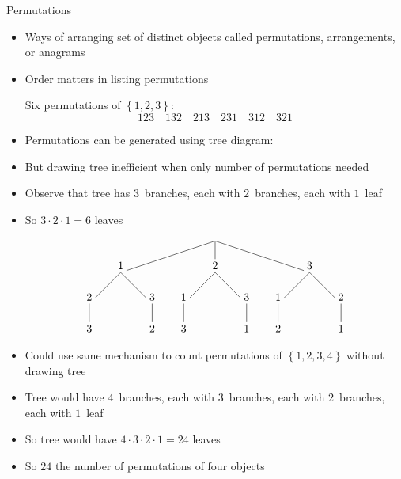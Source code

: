 \documentclass[handout]{beamer}
\theoremstyle{definition}
\begin{document}
\begin{frame}{Permutations}
\begin{itemize}
\item Ways of arranging set of distinct objects called
\alert{permutations}, \alert{arrangements}, or \alert{anagrams}
\item Order matters in listing permutations
\begin{example} Six permutations of $\left\{1,2,3\right\}$:
\[123\quad 132\quad 213\quad 231\quad 312\quad 321\]
\end{example}
\item Permutations can be generated using tree diagram:
\only<+->{
\[\begin{xy}<1cm,0cm>:
(0,0)="0";
(-3,-1)="-31";
(0,-1)="01";
(3,-1)="31";
"0";"-31"*+!D{1}**\dir{-};
"0";"01"*+!D{2}**\dir{-};
"0";"31"*+!D{3}**\dir{-};
"-31";(-4,-2)*+!D{2}**\dir{-};
(-4,-3)*+!D{3}**\dir{-};
"-31";(-2,-2)*+!D{3}**\dir{-};
(-2,-3)*+!D{2}**\dir{-};
"01";(-1,-2)*+!D{1}**\dir{-};
(-1,-3)*+!D{3}**\dir{-};
"01";(1,-2)*+!D{3}**\dir{-};
(1,-3)*+!D{1}**\dir{-};
"31";(2,-2)*+!D{1}**\dir{-};
(2,-3)*+!D{2}**\dir{-};
"31";(4,-2)*+!D{2}**\dir{-};
(4,-3)*+!D{1}**\dir{-};
\end{xy}\]}
\end{itemize}
\end{frame}

\begin{frame}
\begin{itemize}
\item But drawing tree inefficient when only
\alert{number} of permutations needed
\item Observe that tree has $3$~branches,
each with $2$~branches, each with $1$~leaf
\item So $3\cdot 2\cdot 1=6$ leaves
\[\begin{xy}<1cm,0cm>:
(0,0)="0";
(-3,-1)="-31";
(0,-1)="01";
(3,-1)="31";
"0";"-31"*+!D{1}**\dir{-};
"0";"01"*+!D{2}**\dir{-};
"0";"31"*+!D{3}**\dir{-};
"-31";(-4,-2)*+!D{2}**\dir{-};
(-4,-3)*+!D{3}**\dir{-};
"-31";(-2,-2)*+!D{3}**\dir{-};
(-2,-3)*+!D{2}**\dir{-};
"01";(-1,-2)*+!D{1}**\dir{-};
(-1,-3)*+!D{3}**\dir{-};
"01";(1,-2)*+!D{3}**\dir{-};
(1,-3)*+!D{1}**\dir{-};
"31";(2,-2)*+!D{1}**\dir{-};
(2,-3)*+!D{2}**\dir{-};
"31";(4,-2)*+!D{2}**\dir{-};
(4,-3)*+!D{1}**\dir{-};
\end{xy}\]
\item Could use same mechanism to count permutations
of $\left\{1,2,3,4\right\}$ without drawing tree
\item Tree would have $4$~branches, each with $3$~branches,
each with $2$~branches, each with $1$~leaf
\item So tree would have $4\cdot 3\cdot 2\cdot 1=24$ leaves
\item So $24$ the number of permutations of four objects
\end{itemize}
\end{frame}
\end{document}
